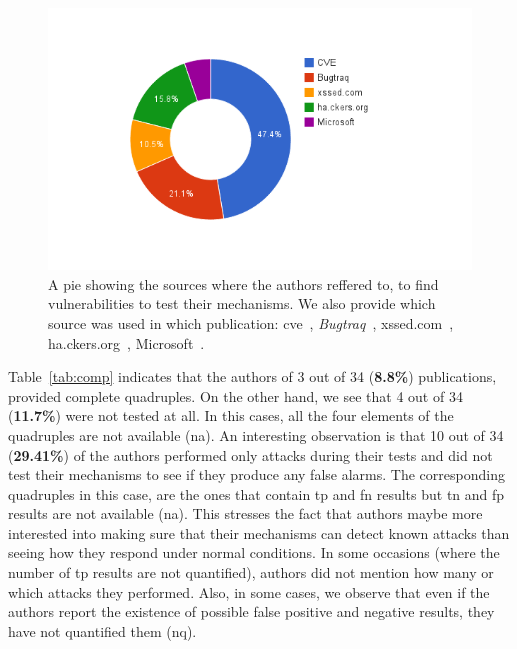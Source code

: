 \documentclass[conference]{IEEEtran}
\begin{document}
\begin{figure}
\begin{center}
\leavevmode
\includegraphics[scale=0.47]{defect-percentages.png}
\end{center}
\caption{\label{fig:defect_sources}A pie showing the sources
where the authors reffered to, to find vulnerabilities to test
their mechanisms. We also provide which source was used
in which publication:
{\sc cve}~\cite{XBS06,NLC07,VFJKKV07,PMP11,BK04,JB07,SMS13,WPLKK09,JKK06a},
{\it Bugtraq}~\cite{PB05,KKVJ06,KJKV09,JEP08},
{\sc xss}ed.com~\cite{NSS06,APKLM10},
ha.ckers.org~\cite{TNH07,PSC09,LV09},
Microsoft~\cite{RDWDE07}.}
\end{figure}

Table~\ref{tab:comp} indicates that the authors of 3 out of 34
({\bf 8.8\%}) publications, provided complete quadruples.
On the other hand, we see that 4 out of
34 ({\bf 11.7\%}) were not tested at all.
In this cases, all the four elements of the
quadruples are not available ({\sc na}).
An interesting observation is that 10 out of 34
({\bf 29.41\%}) of the authors performed only attacks
during their tests and did not test their mechanisms
to see if they produce any false alarms. The corresponding
quadruples in this case, are the ones that contain {\sc tp} and
{\sc fn} results but {\sc tn} and {\sc fp} results are not
available ({\sc na}). This stresses the fact that authors
maybe more interested into making sure that
their mechanisms can detect known attacks than seeing how
they respond under normal conditions.
In some occasions (where the number of {\sc tp} results
are not quantified), authors did not mention how many or
which attacks they performed.
Also, in some cases, we observe that even if
the authors report the existence of possible
false positive and negative results, they have not
quantified them ({\sc nq}).
\end{document}
